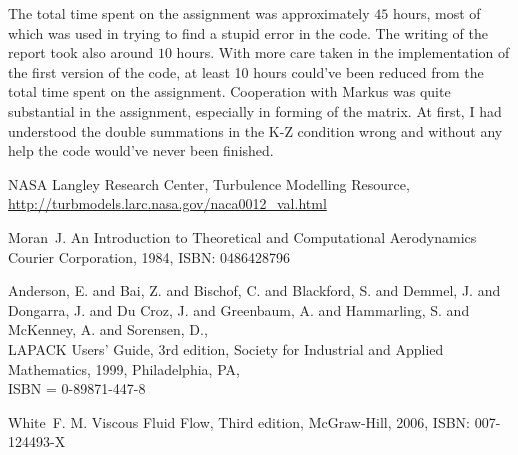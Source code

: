 \documentclass[a4paper,12pt]{article}
\begin{document}
The total time spent on the assignment was approximately $45$ hours, most of which was used in trying to find a stupid error in the code. The writing of the report took also around $10$ hours. With more care taken in the implementation of the first version of the code, at least 10 hours could've been reduced from the total time spent on the assignment. Cooperation with Markus was quite substantial in the assignment, especially in forming of the matrix. At first, I had understood the double summations in the K-Z condition wrong and without any help the code would've never been finished. 

\begin{thebibliography}{99}

     NASA Langley Research Center, 
  Turbulence Modelling Resource,\\
  \url{http://turbmodels.larc.nasa.gov/naca0012_val.html}

 Moran\, J.
An Introduction to Theoretical and Computational Aerodynamics
Courier Corporation, 1984,
ISBN: 0486428796
 


      Anderson, E. and Bai, Z. and Bischof, C. and
                Blackford, S. and Demmel, J. and Dongarra, J. and
                Du Croz, J. and Greenbaum, A. and Hammarling, S. and
                McKenney, A. and Sorensen, D.,\\
      LAPACK Users' Guide,
      3rd edition,
      Society for Industrial and Applied Mathematics,
      1999,
      Philadelphia, PA,\\
      ISBN = 0-89871-447-8 

   White\, F. M.
  Viscous Fluid Flow, Third edition,
  McGraw-Hill, 2006,
  ISBN: 007-124493-X





\end{thebibliography}
\end{document}
